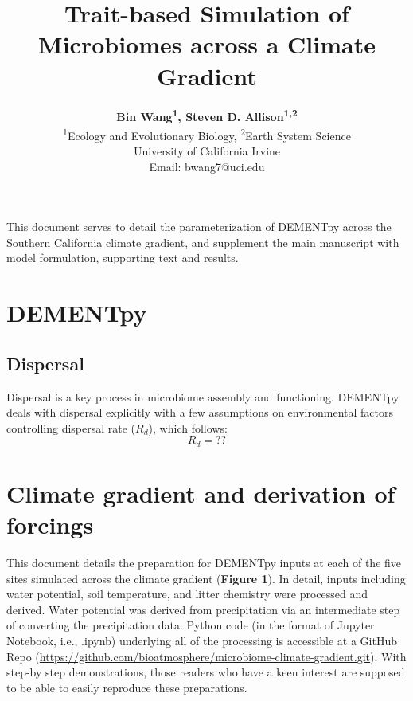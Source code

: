 \documentclass[letterpaper, 10pt]{article}
\begin{document}
\setlength{\droptitle}{-8em} 
\title{\Large\textbf{Trait-based Simulation of Microbiomes across a Climate Gradient}\vspace{-0em}}
\author{\normalsize\textbf{Bin Wang\textsuperscript{1}, Steven D. Allison\textsuperscript{1,2}}\vspace{1em} \\
\textsuperscript{1}Ecology and Evolutionary Biology, \textsuperscript{2}Earth System Science \\
University of California Irvine\vspace{0em} \\
Email: bwang7@uci.edu} 
\maketitle

This document serves to detail the parameterization of DEMENTpy across the Southern California
climate gradient, and supplement the main manuscript with model formulation, supporting text and results.

\section{DEMENTpy}

\subsection{Dispersal}
Dispersal is a key process in microbiome assembly and functioning. DEMENTpy deals with
dispersal explicitly with a few assumptions on environmental factors controlling dispersal rate ($R_{d}$),
which follows:
\begin{equation}
  R_{d} = ?? 
\end{equation}


\section{Climate gradient and derivation of forcings}
This document details the preparation for DEMENTpy inputs at each of the five sites simulated across the climate gradient (\textbf{Figure 1}). In detail, inputs including water potential, soil temperature, and litter chemistry were processed and derived. Water potential was derived from precipitation via an intermediate step of converting the precipitation data. Python code (in the format of Jupyter Notebook, i.e., .ipynb) underlying all of the processing is accessible at a GitHub Repo (\url{https://github.com/bioatmosphere/microbiome-climate-gradient.git}). With step-by step demonstrations, those readers who have a keen interest are supposed to be able to easily reproduce these preparations.
\end{document}
